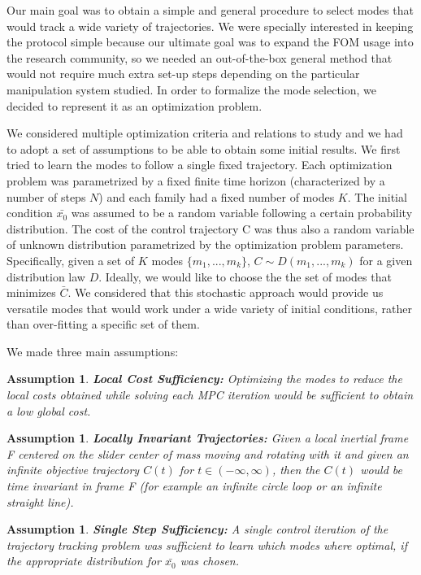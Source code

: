 \documentclass[12,twoside]{TFG-GM}
\newtheorem{assumption}[theorem]{Assumption}
\theoremstyle{definition}
\theoremstyle{remark}
\newcommand*\mean[1]{\bar{#1}}
\newcommand*\diff[1]{\bar{#1}}
\begin{document}
Our main goal was to obtain a simple and general procedure to select modes that would track a wide variety of trajectories. We were specially interested in keeping the protocol simple because our ultimate goal was to expand the FOM usage into the research community, so we needed an out-of-the-box general method that would not require much extra set-up steps depending on the particular manipulation system studied. In order to formalize the mode selection, we decided to represent it as an optimization problem.

We considered multiple optimization criteria and relations to study and we had to adopt a set of assumptions to be able to obtain some initial results. We first tried to learn the modes to follow a single fixed trajectory. Each optimization problem was parametrized by a fixed finite time horizon (characterized by a number of steps $N$) and each family had a fixed number of modes $K$. The initial condition $\diff{x_0}$ was assumed to be a random variable following a certain probability distribution. The cost of the control trajectory C was thus also a random variable of unknown distribution parametrized by the optimization problem parameters. Specifically, given a set of $K$ modes $\{m_1, ..., m_k\}$, $C \sim D(m_1, ..., m_k)$ for a given distribution law $D$. Ideally, we would like to choose the the set of modes that minimizes $\mean{C}$. We considered that this stochastic approach would provide us versatile modes that would work under a wide variety of initial conditions, rather than over-fitting a specific set of them.

We made three main assumptions:
\begin{assumption} \label{ass:localcost}
\textbf{Local Cost Sufficiency:} Optimizing the modes to reduce the local costs obtained while solving each MPC iteration would be sufficient to obtain a low global cost.
\end{assumption}
\begin{assumption} \label{ass:localinv}
\textbf{Locally Invariant Trajectories:} Given a local inertial frame F centered on the slider center of mass moving and rotating with it and given an infinite objective trajectory $C(t)$ for $t \in (-\infty, \infty)$, then the $C(t)$ would be time invariant in frame F (for example an infinite circle loop or an infinite straight line).
\end{assumption}
\begin{assumption} \label{ass:singlestep}
\textbf{Single Step Sufficiency:} A single control iteration of the trajectory tracking problem was sufficient to learn which modes where optimal, if the appropriate distribution for $\diff{x_0}$ was chosen.
\end{assumption} 
\end{document}
